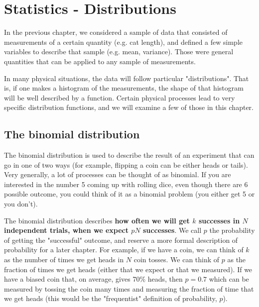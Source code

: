 \chapter{Statistics - Distributions}
\label{chap:StatsDistributions}
In the previous chapter, we considered a sample of data that consisted of measurements of a certain quantity (e.g. cat length), and defined a few simple variables to describe that sample (e.g. mean, variance). Those were general quantities that can be applied to any sample of measurements.

In many physical situations, the data will follow particular "distributions". That is, if one makes a histogram of the measurements, the shape of that histogram will be well described by a function. Certain physical processes lead to very specific distribution functions, and we will examine a few of those in this chapter.

\section{The binomial distribution}

The binomial distribution is used to describe the result of an experiment that can go in one of two ways (for example, flipping a coin can be either heads or tails). Very generally, a lot of processes can be thought of as binomial. If you are interested in the number 5 coming up with rolling dice, even though there are 6 possible outcome, you could think of it as a binomial problem (you either get 5 or you don't).

The binomial distribution describes \textbf{how often we will get $k$ successes in $N$ independent trials, when we expect $pN$ successes}. We call $p$ the probability of getting the "successful" outcome, and reserve a more formal description of probability for a later chapter. For example, if we have a coin, we can think of $k$ as the number of times we get heads in $N$ coin tosses. We can think of $p$ as the fraction of times we get heads (either that we expect or that we measured). If we have a biased coin that, on average, gives 70\% heads, then $p=0.7$ which can be measured by tossing the coin many times and measuring the fraction of time that we get heads (this would be the "frequentist" definition of probability, $p$). 


